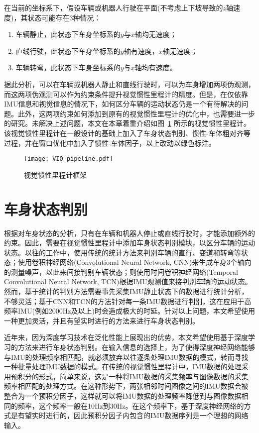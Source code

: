 在当前的坐标系下，假设车辆或机器人行驶在平面(不考虑上下坡导致的$z$轴速度)，其状态可能存在3种情况：
\begin{enumerate}
  \item 车辆静止，此状态下车身坐标系的$y$与$x$轴均无速度；
  \item 直线行驶，此状态下车身坐标系的$y$轴有速度，$x$轴无速度；
  \item 车辆转弯，此状态下车身坐标系的$y$与$x$轴均有速度。
\end{enumerate}

据此分析，可以在车辆或机器人静止和直线行驶时，可以为车身增加两项伪观测，而这两项伪观测可以作为约束条件提升视觉惯性里程计的精度。但是，在仅依靠IMU信息和视觉信息的情况下，如何区分车辆的运动状态仍是一个有待解决的问题。此外，这两项约束如何添加到原有的视觉惯性里程计的优化中，也需要进一步的研究。未解决上述问题，本文在本章着重介绍如图~\ref{fig:vio_pipeline} 所示的视觉惯性里程计。该视觉惯性里程计在一般设计的基础上加入了车身状态判别、惯性-车体粗对齐等过程，并在窗口优化中加入了惯性-车体因子，以上改动以绿色标注。

\begin{figure}
  \centering
  \texttt{[image: VIO\_pipeline.pdf]}
  \caption{视觉惯性里程计框架}
  \label{fig:vio_pipeline}
\end{figure}

\section{车身状态判别}

根据对车身状态的分析，只有在车辆和机器人停止或直线行驶时，才能添加额外的约束。因此，需要在视觉惯性里程计中添加车身状态判别模块，以区分车辆的运动状态。以往的工作中，\citet{hu2020memsimu}使用传统的统计方法来判别车辆的直行、变道和转弯等状态；\citet{brossard2020ai}使用卷积神经网络(Convolutional Neural Network, CNN)来生成车身3个轴向的测量噪声，以此来间接判别车辆状态；\citet{huang2022vehicle}则使用时间卷积神经网络(Temporal Convolutional Neural Network, TCN)根据IMU观测值来接判别车辆的运动状态。然而，基于统计的判别方法需要事先采集IMU静止状态下的数据进行统计分析，不够灵活；基于CNN和TCN的方法针对每一条IMU数据进行判别，这在应用于高频率IMU(例如2000Hz及以上)时会造成极大的时延。针对以上问题，本文希望使用一种更加灵活，并且有望实时进行的方法来进行车身状态判别。

近年来，因为深度学习技术在泛化性能上展现出的优势，本文希望使用基于深度学习的方法来进行车身状态判别。在输入信息的选择上，为了使得深度神经网络能够与IMU的处理频率相匹配，就必须放弃以往逐条处理IMU数据的模式，转而寻找一种批量处理IMU数据的模式。在传统的视觉惯性里程计中，IMU数据的处理采用预积分的形式，简单来说，这是一种将IMU数据的采集频率与图像数据的采集频率相匹配的处理方式。在这种形势下，两张相邻时间图像之间的IMU数据会被整合为一个预积分因子，这样就可以将IMU数据的处理频率降低到与图像数据相同的频率，这个频率一般在10Hz到30Hz。在这个频率下，基于深度神经网络的方式是有望实时进行的，因此预积分因子内包含的IMU数据序列是一个理想的网络输入。

